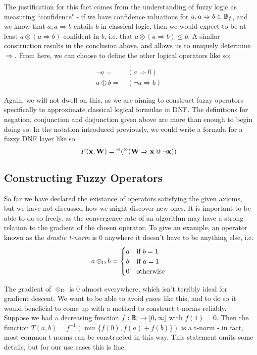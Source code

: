 \documentclass[conference]{report}
\begin{document}
The justification for this fact comes from the understanding of fuzzy logic as measuring ``confidence" - if we have confidence valuations for $a, a \Rightarrow b \in \mathbb{B}_f$, and we know that $a, a \Rightarrow b$ entails $b$ in classical logic, then we would expect to be at least $a \otimes (a \Rightarrow b)$ confident in $b$, i.e. that $a \otimes (a \Rightarrow b) \leq b$. A similar construction results in the conclusion above, and allows us to uniquely determine $\Rightarrow$. From here, we can choose to define the other logical operators like so;

$$
\begin{aligned}
\lnot a =&\ (a \Rightarrow 0) \\
a \oplus b =&\ (\lnot a \Rightarrow b)
\end{aligned}
$$

Again, we will not dwell on this, as we are aiming to construct fuzzy operators specifically to approximate classical logical formulae in DNF. The definitions for negation, conjunction and disjunction given above are more than enough to begin doing so. In the notation introduced previously, we could write a formula for a fuzzy DNF layer like so.
$$
F(\mathbf{x, W}) = {^\oplus}({^\otimes}(\mathbf{W \Rightarrow x {\mspace{4mu}@\mspace{4mu}} \neg x}))$$

\subsection{Constructing Fuzzy Operators}

So far we have declared the existance of operators satisfying the given axioms, but we have not discussed how we might discover new ones. It is important to be able to do so freely, as the convergence rate of an algorithm may have a strong relation to the gradient of the chosen operator. To give an example, an operator known as the \textit{drastic t-norm} is 0 anywhere it doesn't have to be anything else, i.e.
$$a {\mspace{4mu}\otimes_\text{D}\mspace{4mu}} b = \begin{cases}
    a &\text{if } b = 1 \\
    b &\text{if } a = 1 \\
    0 &\text{otherwise}
\end{cases}$$

The gradient of ${\mspace{4mu}\otimes_\text{D}\mspace{4mu}}$ is 0 almost everywhere, which isn't terribly ideal for gradient descent. We want to be able to avoid cases like this, and to do so it would beneficial to come up with a method to construct t-norms reliably. Suppose we had a decreasing function $f:\mathbb{B}_\text{f} \to [0,\infty]$ with $f(1)=0$. Then the function $T(a,b) = f^{-1}(\min\{f(0), f(a) + f(b)\})$ is a t-norm - in fact, most common t-norms can be constructed in this way. This statement omits some details, but for our use cases this is fine.
\end{document}
